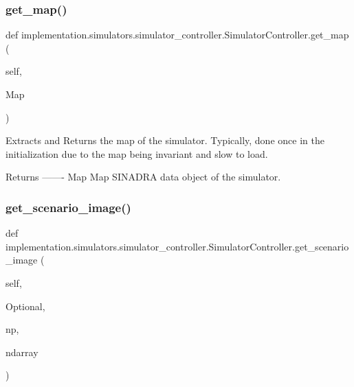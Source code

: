\subsubsection{\texorpdfstring{get\+\_\+map()}{get\_map()}}
{\footnotesize\ttfamily def implementation.\+simulators.\+simulator\+\_\+controller.\+Simulator\+Controller.\+get\+\_\+map (\begin{DoxyParamCaption}\item[{}]{self,  }\item[{}]{Map }\end{DoxyParamCaption})}

\begin{DoxyVerb}Extracts and Returns the map of the simulator. Typically, done once in the initialization due to the map
being invariant and slow to load.

Returns
-------
Map
    Map SINADRA data object of the simulator.
\end{DoxyVerb}
 \mbox{\label{classimplementation_1_1simulators_1_1simulator__controller_1_1_simulator_controller_a60cbb121b4c001e8cf0073676170d45c}} 
\subsubsection{\texorpdfstring{get\+\_\+scenario\+\_\+image()}{get\_scenario\_image()}}
{\footnotesize\ttfamily def implementation.\+simulators.\+simulator\+\_\+controller.\+Simulator\+Controller.\+get\+\_\+scenario\+\_\+image (\begin{DoxyParamCaption}\item[{}]{self,  }\item[{}]{Optional,  }\item[{}]{np,  }\item[{}]{ndarray }\end{DoxyParamCaption})}

